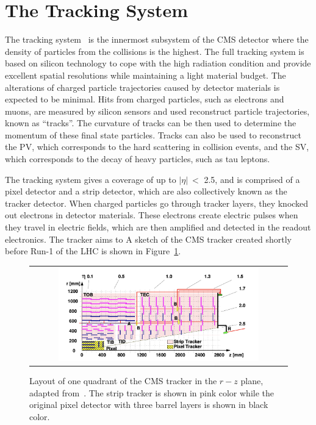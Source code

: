 \section{The Tracking System}
\label{sec:TK}

The tracking system~\cite{CMS:1997tlf} is the innermost subsystem of the \ac{CMS} detector where the density of particles from the collisions is the highest. The full tracking system is based on silicon technology to cope with the high radiation condition and provide excellent spatial resolutions while maintaining a light material budget. The alterations of charged particle trajectories caused by detector materials is expected to be minimal. Hits from charged particles, such as electrons and muons, are measured by silicon sensors and used reconstruct particle trajectories, known as ``tracks''.  The curvature of tracks can be then used to determine the momentum of these final state particles. Tracks can also be used to reconstruct the \ac{PV}, which corresponds to the hard scattering in collision events, and the \ac{SV}, which corresponds to the decay of heavy particles, such as tau leptons. 

The tracking system gives a coverage of up to $|\eta|~<$ 2.5, and is comprised of a pixel detector and a strip detector, which are also collectively known as the tracker detector. When charged particles go through tracker layers, they knocked out electrons in detector materials. These electrons create electric pulses when they travel in electric fields, which are then amplified and detected in the readout electronics. The tracker aims to A sketch of the \ac{CMS} tracker created shortly before Run-1 of the \ac{LHC} is shown in Figure~\ref{fig:Tracker}.

\begin{figure}[tbh!]
 \begin{center}
 \begin{tabular}{c}
 \includegraphics[width=0.8\textwidth]{figures/Part2/CMS/Tracker}
 \end{tabular}
 \caption{Layout of one quadrant of the \ac{CMS} tracker in the $r-z$ plane, adapted from~\cite{CMS:2009dvy}. The strip tracker is shown in pink color while the original pixel detector with three barrel layers is shown in black color.}
 \label{fig:Tracker}
 \end{center}
\end{figure}

